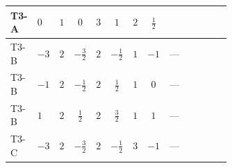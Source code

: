 \documentclass[8pt]{article}
\begin{document}
\begin{landscape}
\begin{longtable}{@{}llcccccc >{\raggedright\arraybackslash}p{0.21\linewidth} >{\raggedright\arraybackslash}p{0.21\linewidth} >{\raggedright\arraybackslash}p{0.21\linewidth}@{}}
\midrule
T3-A & $0$ & $1$ & $0$ & $3$ & $1$ & $2$ & $\frac{1}{2}$ & \scriptsize\adjustbox{max width=\linewidth}{$\begin{gathered} +\left({y_1}\,\left({y_1}\right)^{\dagger}\,{y_1}\right)_{ij}\end{gathered}$} & \scriptsize\adjustbox{max width=\linewidth}{$\begin{gathered} -\frac{9}{2} {g_2}^2 \left({y_1}\right)_{ij}\end{gathered}$} & \scriptsize\adjustbox{max width=\linewidth}{$\begin{gathered} -\frac{3}{2} {g_1}^2 \left({y_1}\right)_{ij}\end{gathered}$} \\
\midrule
T3-B & $-3$ & $2$ & $-\frac{3}{2}$ & $2$ & $-\frac{1}{2}$ & $1$ & $-1$ & --- & \scriptsize\adjustbox{max width=\linewidth}{$\begin{gathered} -\frac{9}{4} {g_2}^2 \left({y_1}\right)_{ij}\end{gathered}$} & \scriptsize\adjustbox{max width=\linewidth}{$\begin{gathered} -\frac{15}{4} {g_1}^2 \left({y_1}\right)_{ij}\end{gathered}$} \\
\midrule
T3-B & $-1$ & $2$ & $-\frac{1}{2}$ & $2$ & $\frac{1}{2}$ & $1$ & $0$ & --- & \scriptsize\adjustbox{max width=\linewidth}{$\begin{gathered} -\frac{9}{4} {g_2}^2 \left({y_1}\right)_{ij}\end{gathered}$} & \scriptsize\adjustbox{max width=\linewidth}{$\begin{gathered} -\frac{3}{4} {g_1}^2 \left({y_1}\right)_{ij}\end{gathered}$} \\
\midrule
T3-B & $1$ & $2$ & $\frac{1}{2}$ & $2$ & $\frac{3}{2}$ & $1$ & $1$ & --- & \scriptsize\adjustbox{max width=\linewidth}{$\begin{gathered} -\frac{9}{4} {g_2}^2 \left({y_1}\right)_{ij}\end{gathered}$} & \scriptsize\adjustbox{max width=\linewidth}{$\begin{gathered} -\frac{15}{4} {g_1}^2 \left({y_1}\right)_{ij}\end{gathered}$} \\
\midrule
T3-C & $-3$ & $2$ & $-\frac{3}{2}$ & $2$ & $-\frac{1}{2}$ & $3$ & $-1$ & --- & \scriptsize\adjustbox{max width=\linewidth}{$\begin{gathered} -\frac{33}{4} {g_2}^2 \left({y_1}\right)_{ij}\end{gathered}$} & \scriptsize\adjustbox{max width=\linewidth}{$\begin{gathered} -\frac{15}{4} {g_1}^2 \left({y_1}\right)_{ij}\end{gathered}$} \\

\end{longtable}
\end{landscape}
\end{document}
